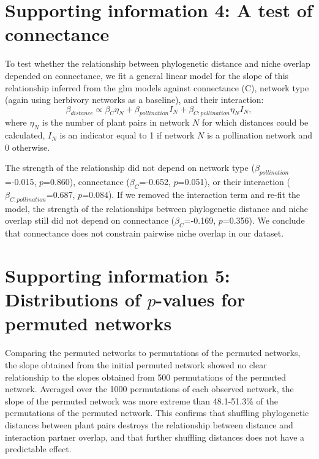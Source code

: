 \documentclass[12pt]{article}
\begin{document}
\begin{spacing}{1.5}
\section*{Supporting information 4: A test of connectance}

    To test whether the relationship between phylogenetic distance and niche overlap depended on connectance, we fit a general linear model for the slope of this relationship inferred from the glm models against connectance (C), network type (again using herbivory networks as a baseline), and their interaction:
      \begin{equation}
        \beta_{distance} \propto \beta_{C} \eta_{N} + \beta_{pollination} I_N + \beta_{C:pollination} \eta_{N} I_N ,
      \end{equation}
    where $\eta_{N}$ is the number of plant pairs in network $N$ for which distances could be calculated, $I_N$ is an indicator equal to 1 if network $N$ is a pollination network and 0 otherwise. 

    
    The strength of the relationship did not depend on network type ($\beta_{pollination}$=-0.015, $p$=0.860), connectance ($\beta_{C}$=-0.652, $p$=0.051), or their interaction ($\beta_{C:pollination}$=0.687, $p$=0.084). 
    If we removed the interaction term and re-fit the model, the strength of the relationships between phylogenetic distance and niche overlap still did not depend on connectance ($\beta_{C}$=-0.169, $p$=0.356). We conclude that connectance does not constrain pairwise niche overlap in our dataset.


\clearpage

\section*{Supporting information 5: Distributions of $p$-values for permuted networks}


    Comparing the permuted networks to permutations of the permuted networks, the slope obtained from the initial permuted network showed no clear relationship to the slopes obtained from 500 permutations of the permuted network. Averaged over the 1000 permutations of each observed network, the slope of the permuted network was more extreme than 48.1-51.3\% of the permutations of the permuted network. This confirms that shuffling phylogenetic distances between plant pairs destroys the relationship between distance and interaction partner overlap, and that further shuffling distances does not have a predictable effect.



\end{spacing}
\end{document}

